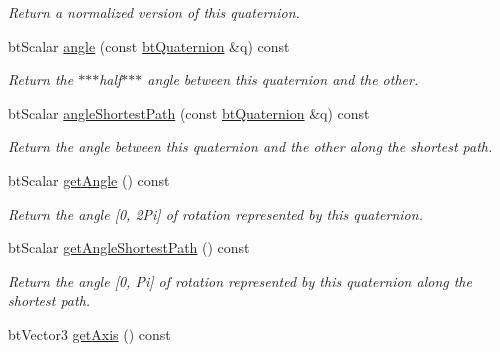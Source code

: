 \begin{CompactItemize}
\begin{CompactList}\small\item\em Return a normalized version of this quaternion. \item\end{CompactList}\item 
btScalar \hyperlink{classbt_quaternion_6398a143dbe4bbf6211d90bc8c2dd2bc}{angle} (const \hyperlink{classbt_quaternion}{btQuaternion} \&q) const 
\begin{CompactList}\small\item\em Return the $\ast$$\ast$$\ast$half$\ast$$\ast$$\ast$ angle between this quaternion and the other. \item\end{CompactList}\item 
btScalar \hyperlink{classbt_quaternion_3160453535401db05d3926d7bc0ca5de}{angleShortestPath} (const \hyperlink{classbt_quaternion}{btQuaternion} \&q) const 
\begin{CompactList}\small\item\em Return the angle between this quaternion and the other along the shortest path. \item\end{CompactList}\item 
\hypertarget{classbt_quaternion_4071aa455c5850f651be8d49d3db7133}{
btScalar \hyperlink{classbt_quaternion_4071aa455c5850f651be8d49d3db7133}{getAngle} () const }
\label{classbt_quaternion_4071aa455c5850f651be8d49d3db7133}

\begin{CompactList}\small\item\em Return the angle \mbox{[}0, 2Pi\mbox{]} of rotation represented by this quaternion. \item\end{CompactList}\item 
\hypertarget{classbt_quaternion_d6a6022b5b0d3ec7d900e01c367ced05}{
btScalar \hyperlink{classbt_quaternion_d6a6022b5b0d3ec7d900e01c367ced05}{getAngleShortestPath} () const }
\label{classbt_quaternion_d6a6022b5b0d3ec7d900e01c367ced05}

\begin{CompactList}\small\item\em Return the angle \mbox{[}0, Pi\mbox{]} of rotation represented by this quaternion along the shortest path. \item\end{CompactList}\item 
\hypertarget{classbt_quaternion_465718d2a4eb88eb0bd1ab98e73140c3}{
btVector3 \hyperlink{classbt_quaternion_465718d2a4eb88eb0bd1ab98e73140c3}{getAxis} () const }
\label{classbt_quaternion_465718d2a4eb88eb0bd1ab98e73140c3}


\end{CompactItemize}
